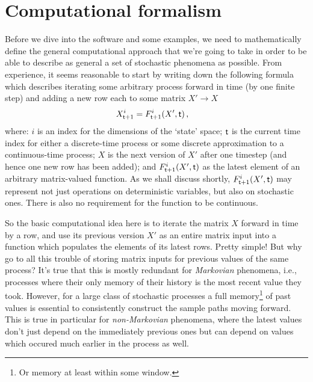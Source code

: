 \documentclass{book}
\begin{document}
\section{\sffamily Computational formalism}

Before we dive into the software and some examples, we need to mathematically define the general computational approach that we're going to take in order to be able to describe as general a set of stochastic phenomena as possible. From experience, it seems reasonable to start by writing down the following formula which describes iterating some arbitrary process forward in time (by one finite step) and adding a new row each to some matrix $X' \rightarrow X$
\begin{align}
X^{i}_{{\sf t}+1} &= F^{i}_{{\sf t}+1}(X',{\sf t}) \,, \label{eq:x-step-def}
\end{align}
where: $i$ is an index for the dimensions of the `state' space; ${\sf t}$ is the current time index for either a discrete-time process or some discrete approximation to a continuous-time process; $X$ is the next version of $X'$ after one timestep (and hence one new row has been added); and $F^i_{{\sf t}+1}(X',{\sf t})$ as the latest element of an arbitrary matrix-valued function. As we shall discuss shortly, $F^i_{{\sf t}+1}(X',{\sf t})$ may represent not just operations on deterministic variables, but also on stochastic ones. There is also no requirement for the function to be continuous.

So the basic computational idea here is to iterate the matrix $X$ forward in time by a row, and use its previous version $X'$ as an entire matrix input into a function which populates the elements of its latest rows. Pretty simple! But why go to all this trouble of storing matrix inputs for previous values of the same process? It's true that this is mostly redundant for \emph{Markovian} phenomena, i.e., processes where their only memory of their history is the most recent value they took. However, for a large class of stochastic processes a full memory\footnote{Or memory at least within some window.} of past values is essential to consistently construct the sample paths moving forward. This is true in particular for \emph{non-Markovian} phenomena, where the latest values don't just depend on the immediately previous ones but can depend on values which occured much earlier in the process as well.
\end{document}

